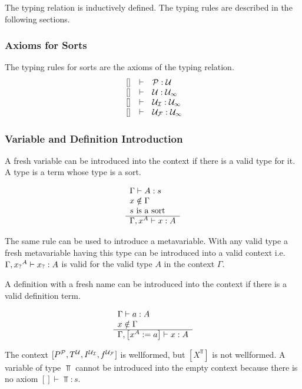The typing relation is inductively defined. The typing rules are described in
the following sections.





\subsubsection{Axioms for Sorts}

The typing rules for sorts are the axioms of the typing relation.
$$
\begin{array}{lllll} 
    \ []  &\vdash& {\mathcal P}: {\mathcal U}
    \\
    \ []  &\vdash& {\mathcal U}: {{\mathcal U}_\infty}
    \\
    \ []  &\vdash& {{\mathcal U}_\mathcal I}: {{\mathcal U}_\infty}
    \\
    \ []  &\vdash& {{\mathcal U}_\mathcal F}: {{\mathcal U}_\infty}
 \end{array}
$$




\subsubsection{Variable and Definition Introduction}

A fresh variable can be introduced into the context if there is a valid type for
it. A type is a term whose type is a sort.

$$
\begin{array}{l} 
    \Gamma \vdash A : s
    \\
    x \notin \Gamma
    \\
    s \text{ is a sort}
 \\ \hline 
    \Gamma, x^A \vdash x : A
 \end{array}
$$

The same rule can be used to introduce a metavariable. With any valid type a
fresh metavariable having this type can be introduced into a valid context i.e.
$\Gamma, {x_?}^A \vdash {x_?}: A$ is valid for the valid type $A$ in the
context $\Gamma$.


A definition with a fresh name can be introduced into the context if there is a
valid definition term.

$$
\begin{array}{l} 
    \Gamma \vdash a : A
    \\
    x \notin \Gamma
 \\ \hline 
    \Gamma, \left[ {x^A := a} \right] \vdash x: A
 \end{array}
$$

The context $[P^{\mathcal P}, T^{\mathcal U}, I^{{\mathcal U}_\mathcal I}, f^{{\mathcal U}_\mathcal F}]$ is wellformed, but
$[X^\Top]$ is not wellformed. A variable of type $\Top$ cannot be introduced
into the empty context because there is no axiom $[] \vdash \Top: s$.






